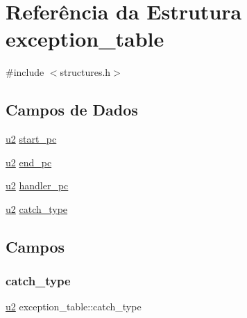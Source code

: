 \hypertarget{structexception__table}{}\section{Referência da Estrutura exception\+\_\+table}
\label{structexception__table}


{\ttfamily \#include $<$structures.\+h$>$}

\subsection*{Campos de Dados}
\begin{DoxyCompactItemize}
\item 
\hyperlink{lista__operandos_8h_a732cde1300aafb73b0ea6c2558a7a54f}{u2} \hyperlink{structexception__table_a63da93a2b0f5dc61b3a158a0c7384602}{start\+\_\+pc}
\item 
\hyperlink{lista__operandos_8h_a732cde1300aafb73b0ea6c2558a7a54f}{u2} \hyperlink{structexception__table_aeb4c86c92f02d6fccd52a0a9be9c5dac}{end\+\_\+pc}
\item 
\hyperlink{lista__operandos_8h_a732cde1300aafb73b0ea6c2558a7a54f}{u2} \hyperlink{structexception__table_a8fe6fb5063598ad0d48aab5e617d6a35}{handler\+\_\+pc}
\item 
\hyperlink{lista__operandos_8h_a732cde1300aafb73b0ea6c2558a7a54f}{u2} \hyperlink{structexception__table_ade50b30a987f3d3452a6de69eee0ada5}{catch\+\_\+type}
\end{DoxyCompactItemize}


\subsection{Campos}
\mbox{\label{structexception__table_ade50b30a987f3d3452a6de69eee0ada5}} 
\subsubsection{\texorpdfstring{catch\+\_\+type}{catch\_type}}
{\footnotesize\ttfamily \hyperlink{lista__operandos_8h_a732cde1300aafb73b0ea6c2558a7a54f}{u2} exception\+\_\+table\+::catch\+\_\+type}

\mbox{\label{structexception__table_aeb4c86c92f02d6fccd52a0a9be9c5dac}} 
